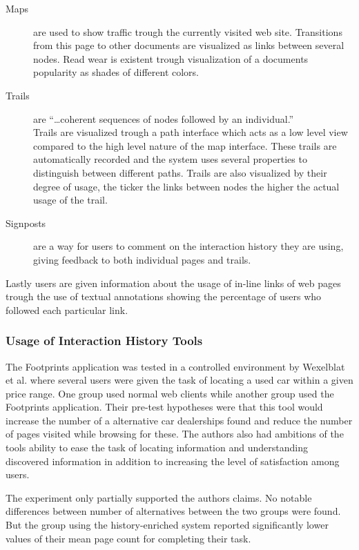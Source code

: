\documentclass[12pt,a4paper]{article}
\begin{document}
\begin{description}
  \item[Maps] are used to show traffic trough the currently visited
    web site. Transitions from this page to other documents are visualized as
    links between several nodes. Read wear is existent trough visualization of
    a documents popularity as shades of different colors.
  \item[Trails] are ``\ldots coherent sequences of nodes followed by an
    individual.''
    \\ \cite{wexelblat99} Trails are visualized trough a path
    interface which acts as a low level view compared to the high level nature
    of the map interface. These trails are automatically recorded and the
    system uses several properties to distinguish between different paths.
    Trails are also visualized by their degree of usage, the ticker the links
    between nodes the higher the actual usage of the trail.
  \item[Signposts] are a way for users to comment on the interaction history
    they are using, giving feedback to both individual pages and trails.
\end{description}

Lastly users are given information about the usage of in-line links of web
pages trough the use of textual annotations showing the percentage of users
who followed each particular link.

\subsubsection{Usage of Interaction History Tools}

The Footprints application was tested in a controlled environment by
Wexelblat et al. where several users were given the task of locating a used
car within a given price range. One group used normal web clients while
another group used the Footprints application.
Their pre-test hypotheses were that this tool
would increase the number of a alternative car dealerships found and reduce
the number of pages visited while browsing for these. The authors also had
ambitions of the tools ability to ease the task of locating
information and understanding discovered information in addition to
increasing the level of satisfaction among users.

The experiment only partially supported the authors claims. No notable
differences between number of alternatives between the two groups were found.
But the group using the history-enriched system reported significantly lower
values of their mean page count for completing their task.
\end{document}

